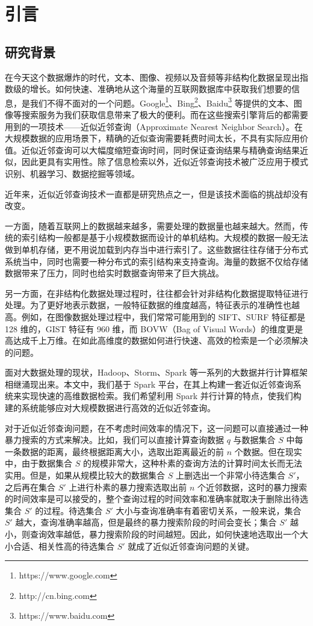 

\chapter{引言}
\label{cha:introdction}

\section{研究背景}
在今天这个数据爆炸的时代，文本、图像、视频以及音频等非结构化数据呈现出指数级的增长。如何快速、准确地从这个海量的互联网数据库中获取我们想要的信息，是我们不得不面对的一个问题。Google\footnote{https://www.google.com}、Bing\footnote{http://cn.bing.com}、Baidu\footnote{https://www.baidu.com} 等提供的文本、图像等搜索服务为我们获取信息带来了极大的便利。而在这些搜索引擎背后的都需要用到的一项技术——近似近邻查询（Approximate Nearest Neighbor Search）。在大规模数据的应用场景下，精确的近似查询需要耗费时间太长，不具有实际应用价值。近似近邻查询可以大幅度缩短查询时间，同时保证查询结果与精确查询结果近似，因此更具有实用性。除了信息检索以外，近似近邻查询技术被广泛应用于模式识别、机器学习、数据挖掘等领域。

近年来，近似近邻查询技术一直都是研究热点之一，但是该技术面临的挑战却没有改变。

一方面，随着互联网上的数据越来越多，需要处理的数据量也越来越大。然而，传统的索引结构一般都是基于小规模数据而设计的单机结构。大规模的数据一般无法做到单机存储，更不用说加载到内存当中进行索引了。这些数据往往存储于分布式系统当中，同时也需要一种分布式的索引结构来支持查询。海量的数据不仅给存储数据带来了压力，同时也给实时数据查询带来了巨大挑战。

另一方面，在非结构化数据处理过程时，往往都会针对非结构化数据提取特征进行处理。为了更好地表示数据，一般特征数据的维度越高，特征表示的准确性也越高。例如，在图像数据处理过程中，我们常常可能用到的 SIFT、SURF 特征都是 128 维的，GIST 特征有 960 维，而 BOVW（Bag of Visual Words）的维度更是高达成千上万维。在如此高维度的数据如何进行快速、高效的检索是一个必须解决的问题。

面对大数据处理的现状，Hadoop、Storm、Spark 等一系列的大数据并行计算框架相继涌现出来。本文中，我们基于 Spark 平台，在其上构建一套近似近邻查询系统来实现快速的高维数据检索。我们希望利用 Spark 并行计算的特点，使我们构建的系统能够应对大规模数据进行高效的近似近邻查询。

对于近似近邻查询问题，在不考虑时间效率的情况下，这一问题可以直接通过一种暴力搜索的方式来解决。比如，我们可以直接计算查询数据 $q$ 与数据集合 $S$ 中每一条数据的距离，最终根据距离大小，选取出距离最近的前 $n$ 个数据。但在现实中，由于数据集合 $S$ 的规模非常大，这种朴素的查询方法的计算时间太长而无法实用。但是，如果从规模比较大的数据集合 $S$ 上删选出一个非常小待选集合 $S'$，之后再在集合 $S'$ 上进行朴素的暴力搜索选取出前 $n$ 个近邻数据，这时的暴力搜索的时间效率是可以接受的，整个查询过程的时间效率和准确率就取决于删除出待选集合 $S'$ 的过程。待选集合 $S'$ 大小与查询准确率有着密切关系，一般来说，集合 $S'$ 越大，查询准确率越高，但是最终的暴力搜索阶段的时间会变长；集合 $S'$ 越小，则查询效率越低，暴力搜索阶段的时间越短。因此，如何快速地选取出一个大小合适、相关性高的待选集合 $S'$ 就成了近似近邻查询问题的关键。

